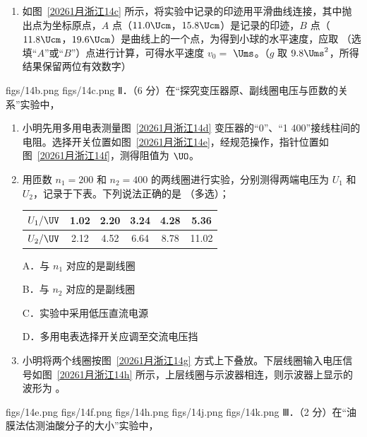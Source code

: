 \documentclass[\gkver]{gaokaozhenti}
\begin{document}
\begin{enumerate}
\begin{enumerate}
	A．调节装置使其背板竖直

	B．调节斜槽使其末端切线水平

	C．以斜槽的末端在白纸上的投影点为坐标原点

	D．钢球在斜槽静止释放的高度应等间距下降

	\item
	如图~\ref{20261月浙江14c} 所示，将实验中记录的印迹用平滑曲线连接，其中抛出点为坐标原点，$A$ 点（$11.0\Ucm$，$15.8\Ucm$）是记录的印迹，$B$ 点（$11.8\Ucm$，$19.6\Ucm$）是曲线上的一个点，为得到小球的水平速度，应取  （选填“$A$”或“$B$”）点进行计算，可得水平速度 $v_{0}=$  $\Ums$。（$g$ 取 $9.8\Ums^{2}$，所得结果保留两位有效数字）
\end{enumerate}
{figs/14b.png}
{figs/14c.png}
Ⅱ．（6 分）在“探究变压器原、副线圈电压与匝数的关系”实验中，

\begin{enumerate}
	\item
	小明先用多用电表测量图~\ref{20261月浙江14d} 变压器的“0”、“1 400”接线柱间的电阻。选择开关位置如图~\ref{20261月浙江14e}，经规范操作，指针位置如图~\ref{20261月浙江14f}，测得阻值为  $\UO$。
	\item
	用匝数 $n_{1} = 200$ 和 $n_{2} = 400$ 的两线圈进行实验，分别测得两端电压为 $U_{1}$ 和 $U_{2}$，记录于下表。下列说法正确的是  （多选）；

	\begin{center}
	\begin{tabular}{|c|c|c|c|c|c|}
	\hline
	$U_{1}/\UV$ & 1.02 & 2.20 & 3.24 & 4.28 & 5.36 \\ \hline
	$U_{2}/\UV$ & 2.12 & 4.52 & 6.64 & 8.78 & 11.02 \\ \hline
	\end{tabular}
	\end{center}

	A．与 $n_{1}$ 对应的是副线圈

	B．与 $n_{2}$ 对应的是副线圈

	C．实验中采用低压直流电源

	D．多用电表选择开关应调至交流电压挡

	\item
	小明将两个线圈按图~\ref{20261月浙江14g} 方式上下叠放。下层线圈输入电压信号如图~\ref{20261月浙江14h} 所示，上层线圈与示波器相连，则示波器上显示的波形为  。
\end{enumerate}
{figs/14e.png}
{figs/14f.png}
{figs/14h.png}
{figs/14j.png}
{figs/14k.png}
Ⅲ．（2 分）在“油膜法估测油酸分子的大小”实验中，


\end{enumerate}
\end{document}
